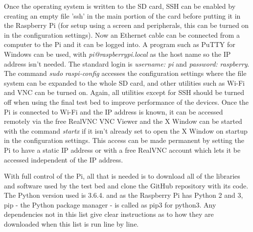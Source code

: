 \documentclass[../main.tex]{subfiles}
\begin{document}
Once the operating system is written to the SD card, SSH can be enabled by creating an empty file 'ssh' in the main portion of the card before putting it in the Raspberry Pi (for setup using a screen and peripherals, this can be turned on in the configuration settings).
Now an Ethernet cable can be connected from a computer to the Pi and it can be logged into.
A program such as PuTTY \cite{lib_PuTTY} for Windows can be used, with \textit{pi@raspberrypi.local} as the host name so the IP address isn't needed.
The standard login is \textit{username: pi} and \textit{password: raspberry}.
The command \textit{sudo raspi-config} accesses the configuration settings where the file system can be expanded to the whole SD card, and other utilities such as Wi-Fi and VNC can be turned on.
Again, all utilities except for SSH should be turned off when using the final test bed to improve performance of the devices.
Once the Pi is connected to Wi-Fi and the IP address is known, it can be accessed remotely via the free RealVNC VNC Viewer \cite{lib_RealVNCViewer} and the X Window can be started with the command \textit{startx} if it isn't already set to open the X Window on startup in the configuration settings.
This access can be made permanent by setting the Pi to have a static IP address or with a free RealVNC account which lets it be accessed independent of the IP address.\\

With full control of the Pi, all that is needed is to download all of the libraries and software used by the test bed and clone the GitHub repository with its code.
The Python version used is 3.6.4.
and as the Raspberry Pi has Python 2 and 3, pip - the Python package manager - is called as pip3 for python3.
Any dependencies not in this list give clear instructions as to how they are downloaded when this list is run line by line.\\
\end{document}

